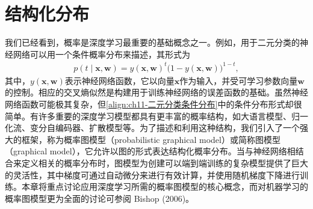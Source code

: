 \documentclass[../main.tex]{subfiles}
\begin{document}
\chapter{结构化分布}\label{chapter:ch11-结构化分布}

我们已经看到，概率是深度学习最重要的基础概念之一。例如，用于二元分类的神经网络可以用一个条件概率分布来描述，其形式为
\begin{align}
  p(t\mid \mathbf{x},\mathbf{w}) = y(\mathbf{x},\mathbf{w})^{t}\bigl(1-y(\mathbf{x},\mathbf{w})\bigr)^{1-t},
  \label{align:ch11-二元分类条件分布}
\end{align}
其中，$y(\mathbf{x},\mathbf{w})$表示神经网络函数，它以向量$\mathbf{x}$作为输入，并受可学习参数向量$\mathbf{w}$的控制。相应的交叉熵似然是构建用于训练神经网络的误差函数的基础。虽然神经网络函数可能极其复杂，但\eqref{align:ch11-二元分类条件分布}中的条件分布形式却很简单。有许多重要的深度学习模型都具有更丰富的概率结构，如大语言模型、归一化流、变分自编码器、扩散模型等。为了描述和利用这种结构，我们引入了一个强大的框架，称为概率图模型（probabilistic graphical model）或简称图模型（graphical model），它允许以图的形式表达结构化概率分布。当与神经网络相结合来定义相关的概率分布时，图模型为创建可以端到端训练的复杂模型提供了巨大的灵活性，其中梯度可通过自动微分来进行有效计算，并使用随机梯度下降进行训练。本章将重点讨论应用深度学习所需的概率图模型的核心概念，而对机器学习的概率图模型更为全面的讨论可参阅 Bishop (2006)。





\end{document}
